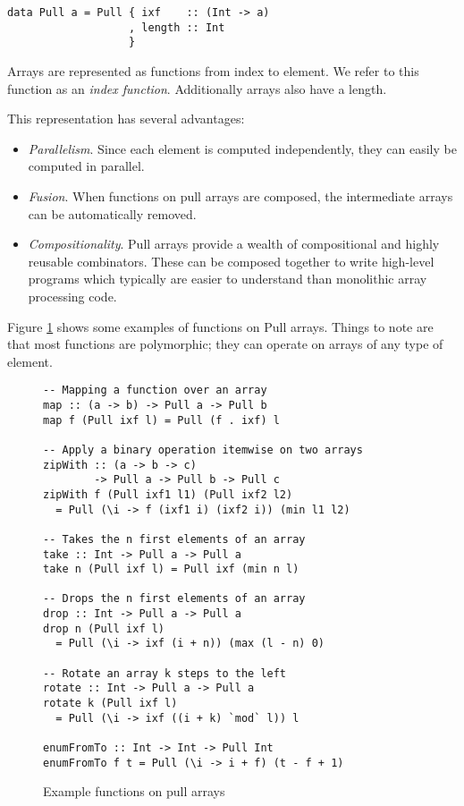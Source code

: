 \documentclass{sigplanconf}
\begin{document}
\begin{verbatim}
data Pull a = Pull { ixf    :: (Int -> a)
                   , length :: Int
                   }
\end{verbatim}

Arrays are represented as functions from index to element. We refer to
this function as an \emph{index function}. Additionally arrays also
have a length.

This representation has several advantages:
\begin{itemize}
\item \emph{Parallelism}. Since each element is computed
  independently, they can easily be computed in parallel.
\item \emph{Fusion}. When functions on pull arrays are composed, the intermediate
  arrays can be automatically removed. 
\item \emph{Compositionality}. Pull arrays provide a wealth of
  compositional and highly reusable combinators. These can be composed
  together to write high-level programs which typically are easier to
  understand than monolithic array processing code.
\end{itemize}

Figure \ref{fig:pullex} shows some examples of functions on Pull
arrays. Things to note are that most functions are polymorphic; they
can operate on arrays of any type of element.

\begin{figure}
\begin{verbatim}
-- Mapping a function over an array
map :: (a -> b) -> Pull a -> Pull b
map f (Pull ixf l) = Pull (f . ixf) l

-- Apply a binary operation itemwise on two arrays
zipWith :: (a -> b -> c)
        -> Pull a -> Pull b -> Pull c
zipWith f (Pull ixf1 l1) (Pull ixf2 l2)
  = Pull (\i -> f (ixf1 i) (ixf2 i)) (min l1 l2)

-- Takes the n first elements of an array
take :: Int -> Pull a -> Pull a
take n (Pull ixf l) = Pull ixf (min n l)

-- Drops the n first elements of an array
drop :: Int -> Pull a -> Pull a
drop n (Pull ixf l)
  = Pull (\i -> ixf (i + n)) (max (l - n) 0)

-- Rotate an array k steps to the left
rotate :: Int -> Pull a -> Pull a
rotate k (Pull ixf l)
  = Pull (\i -> ixf ((i + k) `mod` l)) l

enumFromTo :: Int -> Int -> Pull Int
enumFromTo f t = Pull (\i -> i + f) (t - f + 1)
\end{verbatim}
\caption{Example functions on pull arrays}
\label{fig:pullex}
\end{figure}
\end{document}
